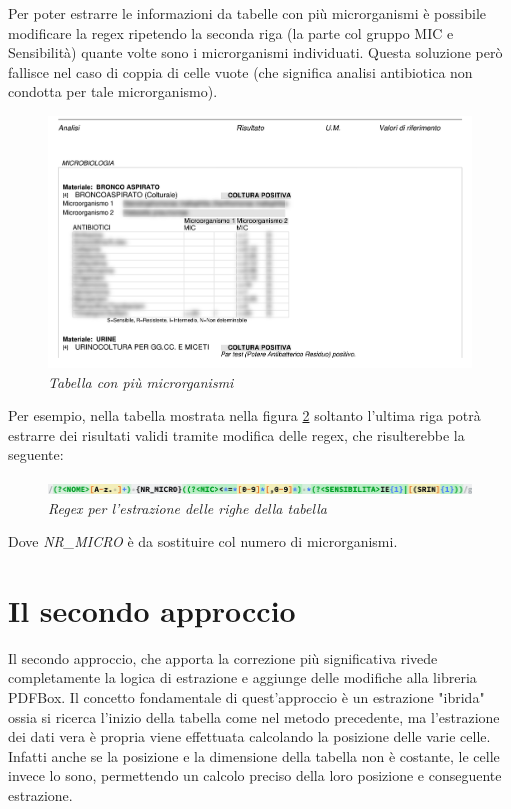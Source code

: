 Per poter estrarre le informazioni da tabelle con più microrganismi è possibile modificare la regex ripetendo la seconda riga (la parte col gruppo MIC e Sensibilità) quante volte sono i microrganismi individuati.
Questa soluzione però fallisce nel caso di coppia di celle vuote (che significa analisi antibiotica non condotta per tale microrganismo).
\newline
\begin{figure}[h!]
	\centering
	\includegraphics[width=.99\columnwidth]{images/content_multi_p1.png}
	\caption{\textit{Tabella con più microrganismi}}
	\label{fig:content_multi_1}
\end{figure}
\newline
Per esempio, nella tabella mostrata nella figura \ref{fig:content_multi_1} soltanto l'ultima riga potrà estrarre dei risultati validi tramite modifica delle regex, che risulterebbe la seguente:
\begin{figure}[h!]
	\centering
	\includegraphics[width=.99\columnwidth]{images/regex_2.png}
	\caption{\textit{Regex per l'estrazione delle righe della tabella}}
	\label{fig:content_multi_1}
\end{figure}
Dove \textit{NR\_MICRO} è da sostituire col numero di microrganismi.
\section{Il secondo approccio}
Il secondo approccio, che apporta la correzione più significativa rivede completamente la logica di estrazione e aggiunge delle modifiche alla libreria PDFBox.
Il concetto fondamentale di quest'approccio è un estrazione "ibrida" ossia si ricerca l'inizio della tabella come nel metodo precedente, ma l'estrazione dei dati vera è propria viene effettuata calcolando la posizione delle varie celle.
\newline
Infatti anche se la posizione e la dimensione della tabella non è costante, le celle invece lo sono, permettendo un calcolo preciso della loro posizione e conseguente estrazione.
